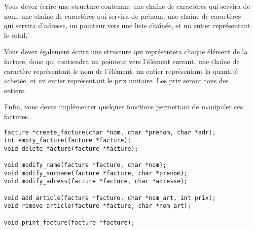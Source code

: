 

\vspace*{0.7cm}

\noindent {}

\bigskip

\noindent Vous devez écrire une structure  contenant une chaîne de caractères qui servira de nom, une chaîne de caractères qui servira de prénom, une chaîne de caractères qui servira d'adresse, un pointeur vers une liste chaînée, et un entier représentant le total.

\bigskip

\noindent Vous devez également écrire une structure  qui représentera chaque élément de la facture, donc qui contiendra un pointeur vers l'élément suivant, une chaîne de caractère représentant le nom de l'élément, un entier représentant la quantité achetée, et un entier représentant le prix unitaire.
Les prix seront tous des entiers.

\bigskip

\noindent Enfin, vous devez implémenter quelques fonctions permettant de manipuler ces factures.

\bigskip

\lstset{language=C}
\begin{lstlisting}[frame=single,title={Prototype des fonctions}]
facture *create_facture(char *nom, char *prenom, char *adr);
int empty_facture(facture *facture);
void delete_facture(facture *facture);

void modify_name(facture *facture, char *nom);
void modify_surname(facture *facture, char *prenom);
void modify_adress(facture *facture, char *adresse);

void add_article(facture *facture, char *nom_art, int prix);
void remove_article(facture *facture, char *nom_art);

void print_facture(facture *facture);
\end{lstlisting}

\bigskip

\subsubsection*{}

